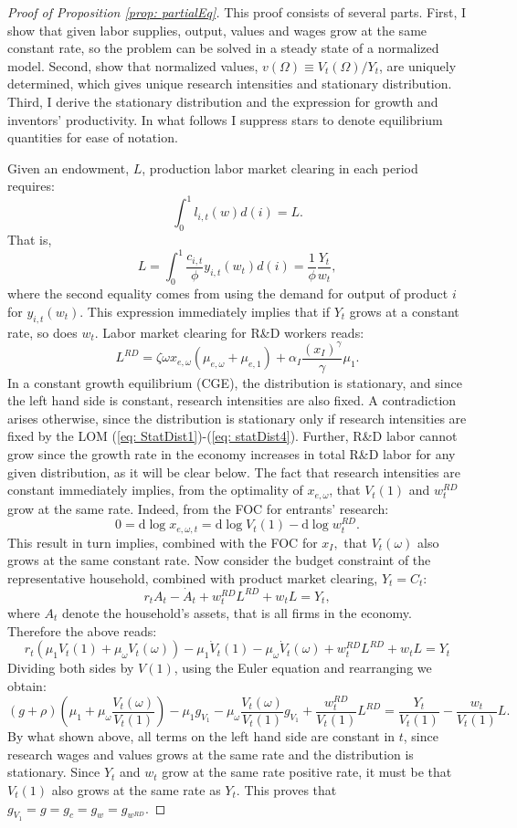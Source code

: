 \begin{proof}[Proof of Proposition \ref{prop: partialEq}]
 This proof consists of several parts. First, I show that given labor
supplies, output, values and wages grow at the same constant rate,
so the problem can be solved in a steady state of a normalized model.
Second, show that normalized values, $v(\Omega)\equiv V_{t}(\Omega)/Y_{t}$,
are uniquely determined, which gives unique research intensities and
stationary distribution. Third, I derive the stationary distribution
and the expression for growth and inventors' productivity. In what
follows I suppress stars to denote equilibrium quantities for ease
of notation.

Given an endowment, $L$, production labor market clearing in each
period requires:
\[
\int_{0}^{1}l_{i,t}(w)d(i)=L.
\]
That is,
\[
L=\int_{0}^{1}\frac{c_{i,t}}{\phi}y_{i,t}\left(w_{t}\right)d(i)=\frac{1}{\phi}\frac{Y_{t}}{w_{t}},
\]
where the second equality comes from using the demand for output of
product $i$ for $y_{i,t}\left(w_{t}\right)$. This expression immediately
implies that if $Y_{t}$ grows at a constant rate, so does $w_{t}$.
Labor market clearing for R\&D workers reads:
\[
L^{RD}=\zeta\omega x_{e,\omega}\left(\mu_{e,\omega}+\mu_{e,1}\right)+\alpha_{I}\frac{\left(x_{I}\right)^{\gamma}}{\gamma}\mu_{1}.
\]
 In a constant growth equilibrium (CGE), the distribution is stationary,
and since the left hand side is constant, research intensities are
also fixed. A contradiction arises otherwise, since the distribution
is stationary only if research intensities are fixed by the LOM (\ref{eq: StatDist1})-(\ref{eq: statDist4}).
Further, R\&D labor cannot grow since the growth rate in the economy
increases in total R\&D labor for any given distribution, as it will
be clear below. The fact that research intensities are constant immediately
implies, from the optimality of $x_{e,\omega}$, that $V_{t}(1)$
and $w_{t}^{RD}$ grow at the same rate. Indeed, from the FOC for
entrants' research:
\[
0=\mathrm{d}\log x_{e,\omega,t}=\mathrm{d}\log V_{t}(1)-\mathrm{d}\log w_{t}^{RD}.
\]
This result in turn implies, combined with the FOC for $x_{I},$ that
$V_{t}(\omega)$ also grows at the same constant rate. Now consider
the budget constraint of the representative household, combined with
product market clearing, $Y_{t}=C_{t}$: 
\[
r_{t}A_{t}-\dot{A}_{t}+w_{t}^{RD}L^{RD}+w_{t}L=Y_{t},
\]
where $A_{t}$ denote the household's assets, that is all firms in
the economy. Therefore the above reads:
\[
r_{t}\left(\mu_{1}V_{t}(1)+\mu_{\omega}V_{t}(\omega)\right)-\mu_{1}\dot{V}_{t}(1)-\mu_{\omega}\dot{V}_{t}(\omega)+w_{t}^{RD}L^{RD}+w_{t}L=Y_{t}
\]
Dividing both sides by $V(1)$, using the Euler equation and rearranging
we obtain:
\[
\left(g+\rho\right)\left(\mu_{1}+\mu_{\omega}\frac{V_{t}(\omega)}{V_{t}(1)}\right)-\mu_{1}g_{V_{1}}-\mu_{\omega}\frac{V_{t}(\omega)}{V_{t}(1)}g_{V_{1}}+\frac{w_{t}^{RD}}{V_{t}(1)}L^{RD}=\frac{Y_{t}}{V_{t}(1)}-\frac{w_{t}}{V_{t}(1)}L.
\]
By what shown above, all terms on the left hand side are constant
in $t$, since research wages and values grows at the same rate and
the distribution is stationary. Since $Y_{t}$ and $w_{t}$ grow at
the same rate positive rate, it must be that $V_{t}(1)$ also grows
at the same rate as $Y_{t}$. This proves that $g_{V_{1}}=g=g_{c}=g_{w}=g_{w^{RD}}.$


\end{proof}
